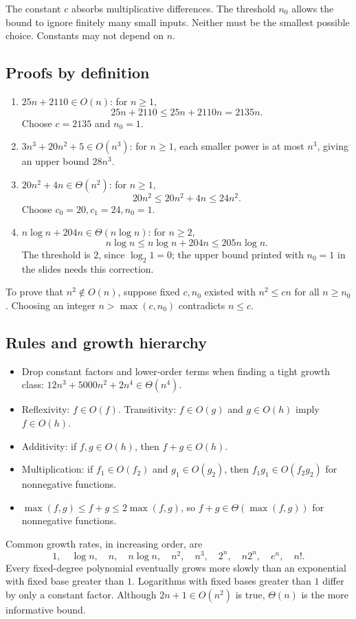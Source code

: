 \documentclass[11pt]{article}
\begin{document}
The constant $c$ absorbs multiplicative differences. The threshold $n_0$ allows the bound to ignore finitely many small inputs. Neither must be the smallest possible choice. Constants may not depend on $n$.

\subsection{Proofs by definition}
\begin{enumerate}
\item $25n+2110\in O(n)$: for $n\ge1$,
\[
25n+2110\le25n+2110n=2135n.
\]
Choose $c=2135$ and $n_0=1$.
\item $3n^3+20n^2+5\in O(n^3)$: for $n\ge1$, each smaller power is at most $n^3$, giving an upper bound $28n^3$.
\item $20n^2+4n\in\Theta(n^2)$: for $n\ge1$,
\[
20n^2\le20n^2+4n\le24n^2.
\]
Choose $c_0=20,c_1=24,n_0=1$.
\item $n\log n+204n\in\Theta(n\log n)$: for $n\ge2$,
\[
n\log n\le n\log n+204n\le205n\log n.
\]
The threshold is $2$, since $\log_2 1=0$; the upper bound printed with $n_0=1$ in the slides needs this correction.
\end{enumerate}

To prove that $n^2\notin O(n)$, suppose fixed $c,n_0$ existed with $n^2\le cn$ for all $n\ge n_0$. Choosing an integer $n>\max(c,n_0)$ contradicts $n\le c$.

\subsection{Rules and growth hierarchy}
\begin{itemize}
\item Drop constant factors and lower-order terms when finding a tight growth class: $12n^3+5000n^2+2n^4\in\Theta(n^4)$.
\item Reflexivity: $f\in O(f)$. Transitivity: $f\in O(g)$ and $g\in O(h)$ imply $f\in O(h)$.
\item Additivity: if $f,g\in O(h)$, then $f+g\in O(h)$.
\item Multiplication: if $f_1\in O(f_2)$ and $g_1\in O(g_2)$, then $f_1g_1\in O(f_2g_2)$ for nonnegative functions.
\item $\max(f,g)\le f+g\le2\max(f,g)$, so $f+g\in\Theta(\max(f,g))$ for nonnegative functions.
\end{itemize}
Common growth rates, in increasing order, are
\[
1,\quad\log n,\quad n,\quad n\log n,\quad n^2,\quad n^3,
\quad2^n,\quad n2^n,\quad e^n,\quad n!.
\]
Every fixed-degree polynomial eventually grows more slowly than an exponential with fixed base greater than $1$. Logarithms with fixed bases greater than $1$ differ by only a constant factor. Although $2n+1\in O(n^2)$ is true, $\Theta(n)$ is the more informative bound.
\end{document}
